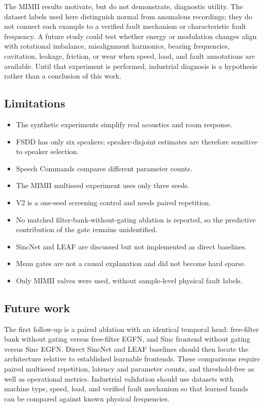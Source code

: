 \documentclass[10pt,twocolumn]{article}
\newcommand{\egfn}{EGFN}
\begin{document}
The MIMII results motivate, but do not demonstrate, diagnostic utility. The
dataset labels used here distinguish normal from anomalous recordings; they do
not connect each example to a verified fault mechanism or characteristic fault
frequency. A future study could test whether energy or modulation changes align
with rotational imbalance, misalignment harmonics, bearing frequencies,
cavitation, leakage, friction, or wear when speed, load, and fault annotations
are available. Until that experiment is performed, industrial diagnosis is a
hypothesis rather than a conclusion of this work.

\subsection{Limitations}

\begin{itemize}
  \item The synthetic experiments simplify real acoustics and room response.
  \item FSDD has only six speakers; speaker-disjoint estimates are therefore
        sensitive to speaker selection.
  \item Speech Commands compares different parameter counts.
  \item The MIMII multiseed experiment uses only three seeds.
  \item V2 is a one-seed screening control and needs paired repetition.
  \item No matched filter-bank-without-gating ablation is reported, so the
        predictive contribution of the gate remains unidentified.
  \item SincNet and LEAF are discussed but not implemented as direct baselines.
  \item Mean gates are not a causal explanation and did not become hard sparse.
  \item Only MIMII valves were used, without sample-level physical fault labels.
\end{itemize}

\subsection{Future work}

The first follow-up is a paired ablation with an identical temporal head:
free-filter bank without gating versus free-filter \egfn{}, and Sinc frontend
without gating versus Sinc \egfn{}. Direct SincNet and LEAF baselines should
then locate the architecture relative to established learnable frontends. These
comparisons require paired multiseed repetition, latency and parameter counts,
and threshold-free as well as operational metrics. Industrial validation should
use datasets with machine type, speed, load, and verified fault mechanism so
that learned bands can be compared against known physical frequencies.
\end{document}

